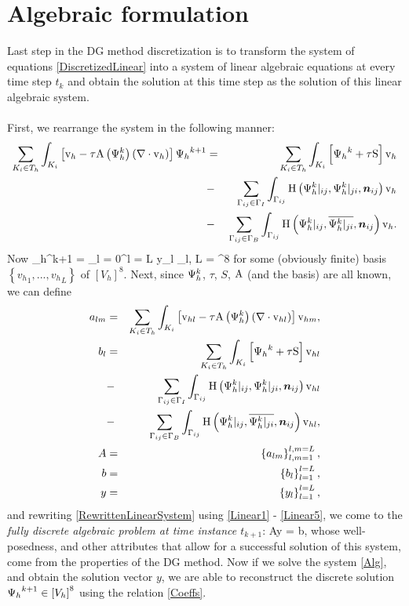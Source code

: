 \section{Algebraic formulation}
Last step in the DG method discretization is to transform the system of equations \ref{DiscretizedLinear} into a system of linear algebraic equations at every time step $t_k$ and obtain the solution at this time step as the solution of this linear algebraic system.
\paragraph{}
First, we rearrange the system in the following manner:
\begin{eqnarray}
\label{RewrittenLinearSystem} \sum_{K_i \in T_h}\int_{K_i} \left[\mathrm{v}_h - \tau\mathrm{A}\left({\mathrm{\Psi}_h^{k}}\right) \left(\nabla \cdot \mathrm{v}_h\right)\right] {\mathrm{\Psi}_h}^{k+1} & = &
\sum_{K_i \in T_h}\int_{K_i} \left[{\mathrm{\Psi}_h}^{k} + \tau\mathrm{S}\right] \mathrm{v}_h \\\nonumber& - &\sum_{\Gamma_{ij}\in\Gamma_I} \int_{\Gamma_{ij}}\mathrm{H}\left({\mathrm{\Psi}_h^{k}}|_{ij}, {\mathrm{\Psi}_h^{k}}|_{ji}, \mbox{\boldmath $n$}_{ij}\right) \mathrm{v}_h
\\\nonumber& - &\sum_{\Gamma_{ij}\in\Gamma_B} \int_{\Gamma_{ij}} \mathrm{H}\left({\mathrm{\Psi}_h^{k}}|_{ij}, \overline{{\mathrm{\Psi}_h^{k}}|_{ji}}, \mbox{\boldmath $n$}_{ij}\right) \mathrm{v}_h.
\end{eqnarray}
Now
\be
\label{Coeffs} {\mrPsi_h}^{k+1} = \sum_{l = 0}^{l = L} y_l {\mrvh}_l, L = \lo\left[V_h\right]^8\ro
\ee
for some (obviously finite) basis $\left\{{v_h}_1, ..., {v_h}_L\right\}$ of $\left[V_h\right]^8$.
Next, since $\mathrm{\Psi}_h^{k}$, $\tau$, $S$, $\mathrm{A}$ (and the basis) are all known, we can define
\begin{eqnarray}
\label{Linear1}
a_{lm} & = & \sum_{K_i \in T_h}\int_{K_i} \left[\mathrm{v}_{hl} - \tau\mathrm{A}\left({\mathrm{\Psi}_h^{k}}\right) \left(\nabla \cdot \mathrm{v}_{hl}\right)\right] \mathrm{v}_{hm}, \\
\label{Linear2}
b_{l} & = & \sum_{K_i \in T_h}\int_{K_i} \left[{\mathrm{\Psi}_h}^{k} + \tau\mathrm{S}\right] \mathrm{v}_{hl}\\\nonumber & - &\sum_{\Gamma_{ij}\in\Gamma_I} \int_{\Gamma_{ij}}\mathrm{H}\left({\mathrm{\Psi}_h^{k}}|_{ij}, {\mathrm{\Psi}_h^{k}}|_{ji}, \mbox{\boldmath $n$}_{ij}\right) \mathrm{v}_{hl}\\\nonumber& - &
\sum_{\Gamma_{ij}\in\Gamma_B} \int_{\Gamma_{ij}} \mathrm{H}\left({\mathrm{\Psi}_h^{k}}|_{ij}, \overline{{\mathrm{\Psi}_h^{k}}|_{ji}}, \mbox{\boldmath $n$}_{ij}\right) \mathrm{v}_{hl},\\
\label{Linear3}
A & = & \left\{a_{lm}\right\}_{l,m = 1}^{l,m = L},\\
\label{Linear4}
b & = & \left\{b_{l}\right\}_{l = 1}^{l = L},\\
y & = & \left\{y_{l}\right\}_{l = 1}^{l = L},
\label{Linear5}
\end{eqnarray}
and rewriting \ref{RewrittenLinearSystem} using \ref{Linear1} - \ref{Linear5}, we come to the \textit{fully discrete algebraic problem at time instance $t_{k+1}$}:
\be
\label{Alg} Ay = b,
\ee
whose well-posedness, and other attributes that allow for a successful solution of this system, come from the properties of the DG method.
Now if we solve the system \ref{Alg}, and obtain the solution vector $y$, we are able to reconstruct the discrete solution ${\mathrm{\Psi}_h}^{k+1} \in \left[V_h\right]^8$ using the relation \ref{Coeffs}.